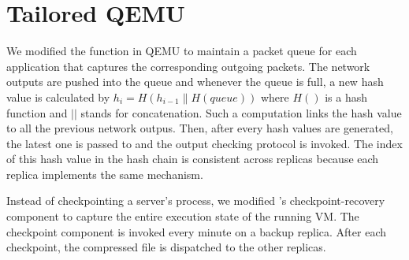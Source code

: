 \section{Tailored QEMU} \label{sec:qemu}

We modified the \taprecv function in QEMU to maintain a packet queue for each application 
that captures the corresponding outgoing packets. The network outputs are pushed into the 
queue and whenever the queue is full, a new hash value is calculated by 
$h_i=H(h_{i-1}\|H(queue))$ where $H()$ is a hash function and $||$ stands for concatenation. 
Such a computation links the hash value to all the previous network outpus. Then, after every 
\thashcomp hash values are generated, the latest one is passed to \smrsystem and the output 
checking protocol is invoked. The index of this hash value in the hash chain is 
consistent across replicas because each replica implements the same mechanism. 

Instead of checkpointing a server's process, we modified \smrsystem's checkpoint-recovery 
component to capture the entire execution state of the running VM. The checkpoint component is 
invoked every minute on a backup replica. After each checkpoint, the compressed file is dispatched 
to the other replicas. 
